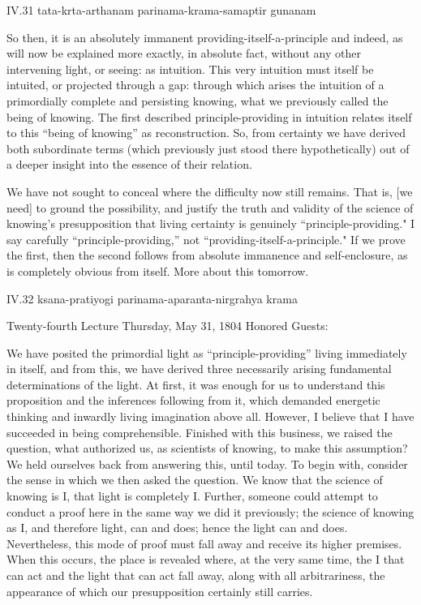 IV.31
tata-krta-arthanam parinama-krama-samaptir gunanam

So then, it is an absolutely immanent
providing-itself-a-principle and indeed,
as will now be explained more exactly,
in absolute fact,
without any other intervening light,
or seeing: as intuition.
This very intuition must itself be intuited,
or projected through a gap:
through which arises the intuition of
a primordially complete and persisting knowing,
what we previously called the being of knowing.
The first described principle-providing in intuition
relates itself to this “being of knowing” as reconstruction.
So, from certainty we have derived both subordinate terms
(which previously just stood there hypothetically)
out of a deeper insight into the essence of their relation.

We have not sought to conceal
where the difficulty now still remains.
That is, [we need] to ground the possibility,
and justify the truth and validity
of the science of knowing's presupposition that
living certainty is genuinely “principle-providing."
I say carefully “principle-providing,”
not “providing-itself-a-principle."
If we prove the first, then the second follows
from absolute immanence and self-enclosure,
as is completely obvious from itself.
More about this tomorrow.

IV.32
ksana-pratiyogi parinama-aparanta-nirgrahya krama

Twenty-fourth Lecture
Thursday, May 31, 1804
Honored Guests:

We have posited the primordial light
as “principle-providing”
living immediately in itself,
and from this, we have derived
three necessarily arising fundamental
determinations of the light.
At first, it was enough for us
to understand this proposition
and the inferences following from it,
which demanded energetic thinking and
inwardly living imagination above all.
However, I believe that I have succeeded in being comprehensible.
Finished with this business, we raised the question,
what authorized us, as scientists of knowing,
to make this assumption?
We held ourselves back from answering this, until today.
To begin with, consider the sense
in which we then asked the question.
We know that the science of knowing is I,
that light is completely I.
Further, someone could attempt to conduct a proof here
in the same way we did it previously;
the science of knowing as I, and therefore light, can and does;
hence the light can and does.
Nevertheless, this mode of proof must fall away
and receive its higher premises.
When this occurs, the place is revealed where,
at the very same time,
the I that can act and the light that can act fall away,
along with all arbitrariness,
the appearance of which our presupposition
certainly still carries.

